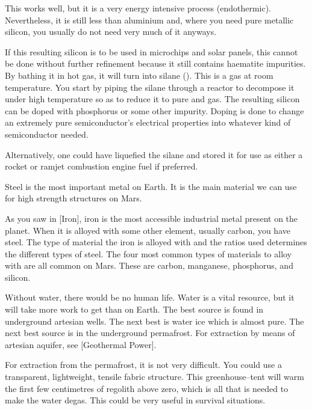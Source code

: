 \startformula
{}
\stopformula

This works well, but it is a very energy intensive process (endothermic). Nevertheless, it is still less than aluminium and, where you need pure metallic silicon, you usually do not need very much of it anyways. 

If this resulting silicon is to be used in microchips and solar panels, this cannot be done without further refinement because it still contains haematite impurities. By bathing it in hot  gas, it will turn into silane (). This is a gas at room temperature. You start by piping the silane through a reactor to decompose it under high temperature so as to reduce it to pure  and  gas. The resulting silicon can be doped with phosphorus or some other impurity. Doping is done to change an extremely pure semiconductor's electrical properties into whatever kind of semiconductor needed.

Alternatively, one could have liquefied the silane and stored it for use as either a rocket or ramjet combustion engine fuel if preferred.

Steel is the most important metal on Earth. It is the main material we can use for high strength structures on Mars.

As you saw in [Iron], iron is the most accessible industrial metal present on the planet. When it is alloyed with some other element, usually carbon, you have steel. The type of material the iron is alloyed with and the ratios used determines the different types of steel. The four most common types of materials to alloy with are all common on Mars. These are carbon, manganese, phosphorus, and silicon.

Without water, there would be no human life. Water is a vital resource, but it will take more work to get than on Earth. The best source is found in underground artesian wells. The next best is water ice which is almost pure. The next best source is in the underground permafrost. For extraction by means of artesian aquifer, see [Geothermal Power].

For extraction from the permafrost, it is not very difficult. You could use a transparent, lightweight, tensile fabric structure. This greenhouse--tent will warm the first few centimetres of regolith above zero, which is all that is needed to make the water degas. This could be very useful in survival situations.

